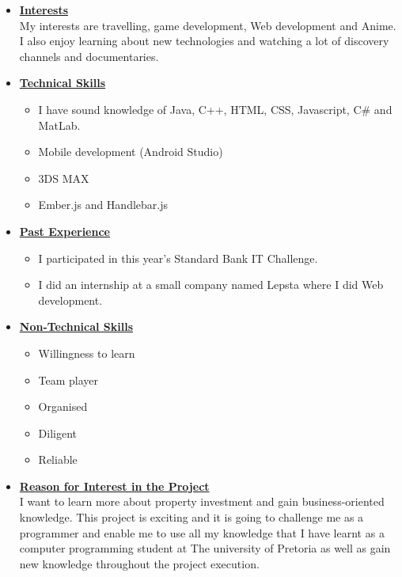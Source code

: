 \documentclass[a4paper,12pt]{article}
\begin{document}
\begin{itemize}
\item {\large \underline{\textbf{Interests}}}\\[0.2cm]
My interests are travelling, game development, Web development and Anime. I also enjoy learning about new technologies and watching a lot of discovery channels and documentaries.

\item {\large \underline{\textbf{Technical Skills}}}
	\begin{itemize}
		\item I have sound knowledge of Java, C++, HTML, CSS, Javascript, C\# and MatLab.
		\item Mobile development (Android Studio)
		\item 3DS MAX
		\item Ember.js and  Handlebar.js
	\end{itemize}
\bigskip
\item {\large \underline{\textbf{Past Experience}}}
\begin{itemize}
\item I participated in this year's Standard Bank IT Challenge.
\item I did an internship at a small company named Lepsta where I did Web development.
\end{itemize}
\bigskip
\item {\large \underline{\textbf{Non-Technical Skills}}}
\begin{itemize}
\item Willingness to learn
\item Team player
\item Organised
\item Diligent
\item Reliable
\end{itemize}
\bigskip
\item {\large \underline{\textbf{Reason for Interest in the Project}}}\\[0.2cm]
I want to learn more about property investment and gain business-oriented knowledge. This project is exciting and it is going to challenge me as a programmer and enable me to use all my knowledge that I have learnt as a computer programming student at The university of Pretoria as well as gain new knowledge throughout the project execution.

\end{itemize}

\newpage
\end{document}
